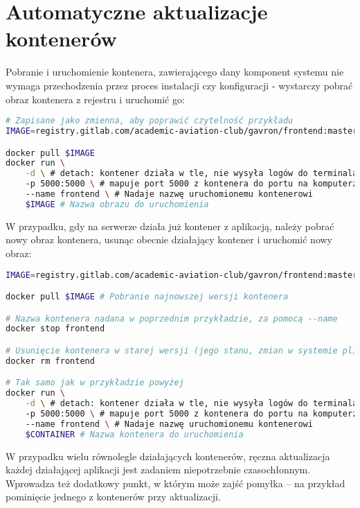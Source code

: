 \section{Automatyczne aktualizacje kontenerów}

Pobranie i uruchomienie kontenera, zawierającego dany komponent systemu
nie wymaga przechodzenia przez proces instalacji czy konfiguracji - wystarczy
pobrać obraz kontenera z rejestru i uruchomić go:

\begin{lstlisting}[language=bash, label=list:docker_clone_run_example,caption={Pobranie i uruchomienie obrazu dockera, zawierającego aplikację}, basicstyle=\footnotesize\ttfamily]
# Zapisane jako zmienna, aby poprawić czytelność przykładu 
IMAGE=registry.gitlab.com/academic-aviation-club/gavron/frontend:master

docker pull $IMAGE
docker run \
    -d \ # detach: kontener działa w tle, nie wysyła logów do terminala
    -p 5000:5000 \ # mapuje port 5000 z kontenera do portu na komputerze  
    --name frontend \ # Nadaje nazwę uruchomionemu kontenerowi
    $IMAGE # Nazwa obrazu do uruchomienia 
\end{lstlisting}

W przypadku, gdy na serwerze działa już kontener z aplikacją, należy
pobrać nowy obraz kontenera, usunąc obecnie działający kontener i uruchomić
nowy obraz:

\begin{lstlisting}[language=bash, label=list:docker_update_container,caption={Aktualizacja kontenerów}, basicstyle=\footnotesize\ttfamily]
IMAGE=registry.gitlab.com/academic-aviation-club/gavron/frontend:master

docker pull $IMAGE # Pobranie najnowszej wersji kontenera

# Nazwa kontenera nadana w poprzednim przykładzie, za pomocą --name
docker stop frontend

# Usunięcie kontenera w starej wersji (jego stanu, zmian w systemie plików)
docker rm frontend

# Tak samo jak w przykładzie powyżej
docker run \
    -d \ # detach: kontener działa w tle, nie wysyła logów do terminala
    -p 5000:5000 \ # mapuje port 5000 z kontenera do portu na komputerze  
    --name frontend \ # Nadaje nazwę uruchomionemu kontenerowi
    $CONTAINER # Nazwa kontenera do uruchomienia 
\end{lstlisting}

W przypadku wielu równolegle działających kontenerów, ręczna aktualizacja 
każdej działającej aplikacji jest zadaniem niepotrzebnie czasochłonnym.
Wprowadza też dodatkowy punkt, w którym może zajść pomyłka -- na przykład
pominięcie jednego z kontenerów przy aktualizacji.

